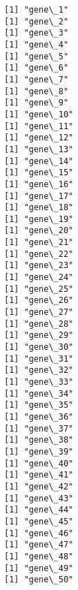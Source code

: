\documentclass[11pt]{article}
\begin{document}
    \begin{Verbatim}[commandchars=\\\{\}]
[1] "gene\_1"
[1] "gene\_2"
[1] "gene\_3"
[1] "gene\_4"
[1] "gene\_5"
[1] "gene\_6"
[1] "gene\_7"
[1] "gene\_8"
[1] "gene\_9"
[1] "gene\_10"
[1] "gene\_11"
[1] "gene\_12"
[1] "gene\_13"
[1] "gene\_14"
[1] "gene\_15"
[1] "gene\_16"
[1] "gene\_17"
[1] "gene\_18"
[1] "gene\_19"
[1] "gene\_20"
[1] "gene\_21"
[1] "gene\_22"
[1] "gene\_23"
[1] "gene\_24"
[1] "gene\_25"
[1] "gene\_26"
[1] "gene\_27"
[1] "gene\_28"
[1] "gene\_29"
[1] "gene\_30"
[1] "gene\_31"
[1] "gene\_32"
[1] "gene\_33"
[1] "gene\_34"
[1] "gene\_35"
[1] "gene\_36"
[1] "gene\_37"
[1] "gene\_38"
[1] "gene\_39"
[1] "gene\_40"
[1] "gene\_41"
[1] "gene\_42"
[1] "gene\_43"
[1] "gene\_44"
[1] "gene\_45"
[1] "gene\_46"
[1] "gene\_47"
[1] "gene\_48"
[1] "gene\_49"
[1] "gene\_50"

    \end{Verbatim}
\end{document}
